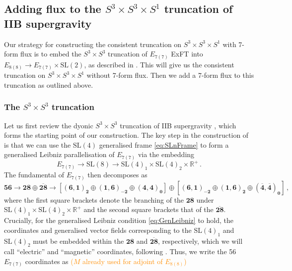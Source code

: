\documentclass[a4paper, 11pt]{article}
\numberwithin{equation}{section}
\newcommand{\SL}[1]{\mathrm{SL}( #1 )}
\newcommand{\EE}{\ensuremath{E_{8(8)}}\xspace}
\newcommand{\En}[1]{E_{#1(#1)}}
\newcommand{\+}{\oplus}
\newcommand{\CE}[1]{\textcolor{darkorange}{#1}}
\begin{document}
\subsection{Adding flux to the $S^3 \times S^3 \times S^1$ truncation of IIB supergravity}
Our strategy for constructing the consistent truncation on $S^3 \times S^3 \times S^1$ with 7-form flux is to embed the $S^3 \times S^3$ truncation of $\En{7}$ ExFT \cite{Inverso:2016eet} into $\EE \rightarrow \En{7} \times \SL{2}$, as described in \cite{Galli:2022idq}. This will give us the consistent truncation on $S^3 \times S^3 \times S^1$ without 7-form flux. Then we add a 7-form flux to this truncation as outlined above.

\subsubsection{The $S^3 \times S^3$ truncation} \label{s:S3S3}
Let us first review the dyonic $S^3 \times S^3$ truncation of IIB supergravity \cite{Inverso:2016eet}, which forms the starting point of our construction. The key step in the construction of \cite{Inverso:2016eet} is that we can use the $\SL{4}$ generalised frame \eqref{eq:SLnFrame} to form a generalised Leibniz parallelisation of $\En{7}$ via the embedding
\begin{equation} \label{eq:SL4Embedding}
	\En{7} \rightarrow \SL{8} \rightarrow \SL{4}_1 \times \SL{4}_2 \times \mathbb{R}^+ \,.
\end{equation}
The fundamental of $\En{7}$ then decomposes as
\begin{equation} \label{eq:56inSL4SL4}
	\mathbf{56} \rightarrow \mathbf{28} \oplus \overline{\mathbf{28}} \rightarrow \left[ \mathbf{\left(6,1\right)_2} \oplus \mathbf{\left(1,6\right)_{-2}} \oplus \mathbf{\left(4,4\right)_0} \right] \oplus \left[ \mathbf{\left(6,1\right)_{-2}} \oplus \mathbf{\left(1,6\right)_{2}} \oplus \mathbf{\left(\overline{4},\overline{4}\right)_0} \right] \,,
\end{equation}
where the first square brackets denote the branching of the $\mathbf{28}$ under $\SL{4}_1 \times \SL{4}_2 \times \mathbb{R}^+$ and the second square brackets that of the $\mathbf{\overline{28}}$. Crucially, for the generalised Leibniz condition \eqref{eq:GenLeibniz} to hold, the coordinates and generalised vector fields corresponding to the $\SL{4}_1$ and $\SL{4}_2$ must be embedded within the $\mathbf{28}$ and $\mathbf{\overline{28}}$, respectively, which we will call ``electric'' and ``magnetic'' coordinates, following \cite{Inverso:2016eet}. Thus, we write the 56 $\En{7}$ coordinates as \CE{($M$ already used for adjoint of \EE)}
\end{document}
